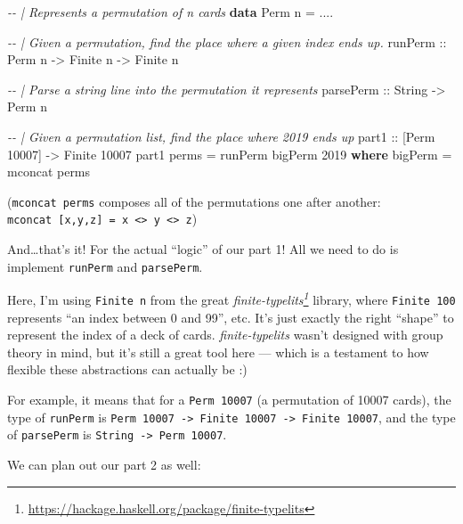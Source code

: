 \documentclass[]{article}
\newenvironment{Shaded}{}{}
\newcommand{\CommentTok}[1]{\textcolor[rgb]{0.38,0.63,0.69}{\textit{#1}}}
\newcommand{\DataTypeTok}[1]{\textcolor[rgb]{0.56,0.13,0.00}{#1}}
\newcommand{\DecValTok}[1]{\textcolor[rgb]{0.25,0.63,0.44}{#1}}
\newcommand{\FunctionTok}[1]{\textcolor[rgb]{0.02,0.16,0.49}{#1}}
\newcommand{\KeywordTok}[1]{\textcolor[rgb]{0.00,0.44,0.13}{\textbf{#1}}}
\newcommand{\NormalTok}[1]{#1}
\newcommand{\OperatorTok}[1]{\textcolor[rgb]{0.40,0.40,0.40}{#1}}
\newcommand{\OtherTok}[1]{\textcolor[rgb]{0.00,0.44,0.13}{#1}}
\renewcommand{\href}[2]{#2\footnote{\url{#1}}}
\begin{document}
\begin{Shaded}
\begin{Highlighting}[]
\CommentTok{{-}{-} | Represents a permutation of n cards}
\KeywordTok{data} \DataTypeTok{Perm}\NormalTok{ n }\OtherTok{=} \OperatorTok{....}

\CommentTok{{-}{-} | Given a permutation, find the place where a given index ends up.}
\OtherTok{runPerm ::} \DataTypeTok{Perm}\NormalTok{ n }\OtherTok{{-}>} \DataTypeTok{Finite}\NormalTok{ n }\OtherTok{{-}>} \DataTypeTok{Finite}\NormalTok{ n}

\CommentTok{{-}{-} | Parse a string line into the permutation it represents}
\OtherTok{parsePerm ::} \DataTypeTok{String} \OtherTok{{-}>} \DataTypeTok{Perm}\NormalTok{ n}

\CommentTok{{-}{-} | Given a permutation list, find the place where 2019 ends up}
\OtherTok{part1 ::}\NormalTok{ [}\DataTypeTok{Perm} \DecValTok{10007}\NormalTok{] }\OtherTok{{-}>} \DataTypeTok{Finite} \DecValTok{10007}
\NormalTok{part1 perms }\OtherTok{=}\NormalTok{ runPerm bigPerm }\DecValTok{2019}
  \KeywordTok{where}
\NormalTok{    bigPerm }\OtherTok{=} \FunctionTok{mconcat}\NormalTok{ perms}
\end{Highlighting}
\end{Shaded}

(\texttt{mconcat\ perms} composes all of the permutations one after another:
\texttt{mconcat\ {[}x,y,z{]}\ =\ x\ \textless{}\textgreater{}\ y\ \textless{}\textgreater{}\ z})

And\ldots that's it! For the actual ``logic'' of our part 1! All we need to do
is implement \texttt{runPerm} and \texttt{parsePerm}.

Here, I'm using \texttt{Finite\ n} from the great
\emph{\href{https://hackage.haskell.org/package/finite-typelits}{finite-typelits}}
library, where \texttt{Finite\ 100} represents ``an index between 0 and 99'',
etc. It's just exactly the right ``shape'' to represent the index of a deck of
cards. \emph{finite-typelits} wasn't designed with group theory in mind, but
it's still a great tool here --- which is a testament to how flexible these
abstractions can actually be :)

For example, it means that for a \texttt{Perm\ 10007} (a permutation of 10007
cards), the type of \texttt{runPerm} is
\texttt{Perm\ 10007\ -\textgreater{}\ Finite\ 10007\ -\textgreater{}\ Finite\ 10007},
and the type of \texttt{parsePerm} is
\texttt{String\ -\textgreater{}\ Perm\ 10007}.

We can plan out our part 2 as well:
\end{document}
